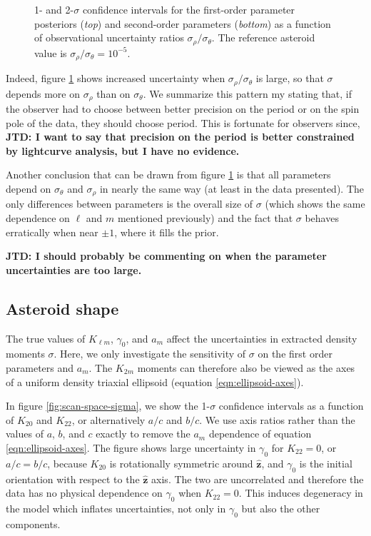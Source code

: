 \documentclass[fleqn,usenatbib]{mnras}
\newcommand{\jtd}[1]{ {\bf{\color{red} JTD: #1}} }
\newcommand{\unit}[1]{\bm{\hat{#1}}}
\begin{document}
\begin{figure}
  \caption{1- and 2-$\sigma$ confidence intervals for the first-order parameter posteriors (\textit{top}) and second-order parameters (\textit{bottom}) as a function of observational uncertainty ratios $\sigma_\rho / \sigma_\theta$. The reference asteroid value is $\sigma_\rho/ \sigma_\theta =10^{-5}$.}
  \label{fig:scan-ratio}
\end{figure}

Indeed, figure  \ref{fig:scan-ratio} shows increased uncertainty when $\sigma_\rho/\sigma_\theta$ is large, so that $\sigma$ depends more on $\sigma_\rho$ than on $\sigma_\theta$. We summarize this pattern my stating that, if the observer had to choose between better precision on the period or on the spin pole of the data, they should choose period. This is fortunate for observers since, \jtd{I want to say that precision on the period is better constrained by lightcurve analysis, but I have no evidence.}

Another conclusion that can be drawn from figure \ref{fig:scan-ratio} is that all parameters depend on $\sigma_\theta$ and $\sigma_\rho$ in nearly the same way (at least in the data presented). The only differences between parameters is the overall size of $\sigma$ (which shows the same dependence on $\ell$ and $m$ mentioned previously) and the fact that $\sigma$ behaves erratically when near $\pm 1$, where it fills the prior.

\jtd{I should probably be commenting on when the parameter uncertainties are too large.}



\subsection{Asteroid shape}
\label{sec:scan-shape}

The true values of $K_{\ell m}$, $\gamma_0$, and $a_m$ affect the uncertainties in extracted density moments $\sigma$. Here, we only investigate the sensitivity of $\sigma$ on the first order parameters and $a_m$. The $K_{2m}$ moments can therefore also be viewed as the axes of a uniform density triaxial ellipsoid (equation \ref{eqn:ellipsoid-axes}).

In figure \ref{fig:scan-space-sigma}, we show the 1-$\sigma$ confidence intervals as a function of $K_{20}$ and $K_{22}$, or alternatively $a/c$ and $b/c$. We use axis ratios rather than the values of $a$, $b$, and $c$ exactly to remove the $a_m$ dependence of equation \ref{eqn:ellipsoid-axes}. The figure shows large uncertainty in $\gamma_0$ for $K_{22}=0$, or $a/c=b/c$, because $K_{20}$ is rotationally symmetric around $\unit z$, and $\gamma_0$ is the initial orientation with respect to the $\unit z$ axis. The two are uncorrelated and therefore the data has no physical dependence on $\gamma_0$ when $K_{22}=0$. This induces degeneracy in the model which inflates uncertainties, not only in $\gamma_0$ but also the other components.
\end{document}
